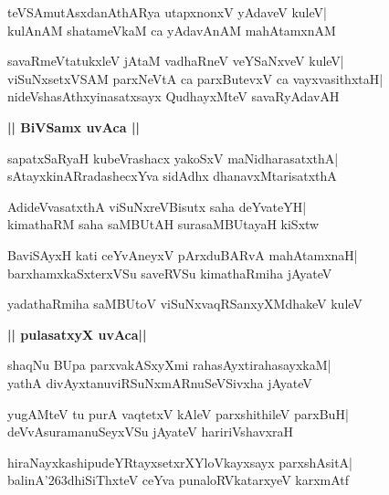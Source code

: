 \documentclass[twoside,12pt,openright]{book}
\def\S{\char'263}
\newcounter{shloka}[chapter]
\def\uvaca#1{\centerline{{\large\textbf{#1}}}}
\begin{document}
\begin{shloka}%
teVSAmutAsxdanAthARya utapxnonxV yAdaveV kuleV|\\
kulAnAM shatameVkaM ca yAdavAnAM mahAtamxnAM
\end{shloka}

\begin{shloka}%
savaRmeVtatukxleV jAtaM vadhaRneV veYSaNxveV kuleV|\\
viSuNxsetxVSAM parxNeVtA ca parxButevxV ca vayxvasithxtaH|\\
nideVshasAthxyinasatxsayx QudhayxMteV savaRyAdavAH
\end{shloka}

\uvaca{|| BiVSamx uvAca ||}
\begin{shloka}%
sapatxSaRyaH kubeVrashacx yakoSxV maNidharasatxthA|\\
sAtayxkinARradashecxYva sidAdhx dhanavxMtarisatxthA
\end{shloka}

\begin{shloka}%
AdideVvasatxthA viSuNxreVBisutx saha deYvateYH|\\
kimathaRM saha saMBUtAH surasaMBUtayaH kiSxtw
\end{shloka}

\begin{shloka}%
BaviSAyxH kati ceYvAneyxV pArxduBARvA mahAtamxnaH|\\
barxhamxkaSxterxVSu saveRVSu kimathaRmiha jAyateV
\end{shloka}

\begin{shloka}%
yadathaRmiha saMBUtoV viSuNxvaqRSanxyXMdhakeV kuleV
\end{shloka}

\uvaca{|| pulasatxyX uvAca||}
\begin{shloka}%
shaqNu BUpa parxvakASxyXmi rahasAyxtirahasayxkaM|\\
yathA divAyxtanuviRSuNxmARnuSeVSivxha jAyateV
\end{shloka}

\begin{shloka}%
yugAMteV tu purA vaqtetxV kAleV parxshithileV parxBuH|\\
deVvAsuramanuSeyxVSu jAyateV haririVshavxraH
\end{shloka}

\begin{shloka}%
hiraNayxkashipudeYRtayxsetxrXYloVkayxsayx parxshAsitA|\\
balinA\S dhiSiThxteV ceYva punaloRVkatarxyeV karxmAtf
\end{shloka}
\end{document}
